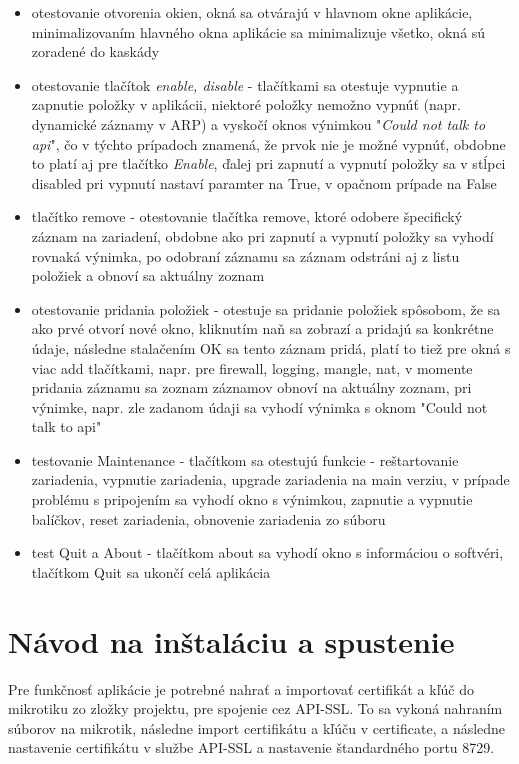 \begin{itemize}
\item otestovanie otvorenia okien, okná sa otvárajú v hlavnom okne aplikácie, minimalizovaním hlavného okna aplikácie sa minimalizuje všetko, okná sú zoradené do kaskády
\item otestovanie tlačítok \textit{enable, disable} - tlačítkami sa otestuje vypnutie a zapnutie položky v aplikácii, niektoré položky nemožno vypnúť (napr. dynamické záznamy v ARP) a vyskočí oknos výnimkou "\textit{Could not talk to api}", čo v týchto prípadoch znamená, že prvok nie je možné vypnúť, obdobne to platí aj pre tlačítko \textit{Enable}, ďalej pri zapnutí a vypnutí položky sa v stĺpci disabled pri vypnutí nastaví paramter na True, v opačnom prípade na False
\item tlačítko remove - otestovanie tlačítka remove, ktoré odobere špecifický záznam na zariadení, obdobne ako pri zapnutí a vypnutí položky sa vyhodí rovnaká výnimka, po odobraní záznamu sa záznam odstráni aj z listu položiek a obnoví sa aktuálny zoznam 
\item otestovanie pridania položiek - otestuje sa pridanie položiek spôsobom, že sa ako prvé otvorí nové okno, kliknutím naň sa zobrazí  a pridajú sa konkrétne údaje, následne stalačením OK sa tento záznam pridá, platí to tiež pre okná s viac add tlačítkami, napr. pre firewall, logging, mangle, nat, v momente pridania záznamu  sa zoznam záznamov obnoví na aktuálny zoznam, pri výnimke, napr. zle zadanom údaji sa vyhodí výnimka s oknom "Could not talk to api"
\item testovanie Maintenance - tlačítkom sa otestujú funkcie - reštartovanie zariadenia, vypnutie zariadenia, upgrade zariadenia na main verziu, v prípade problému s pripojením sa vyhodí okno s výnimkou, zapnutie a vypnutie balíčkov, reset zariadenia, obnovenie zariadenia zo súboru
\item test Quit a About - tlačítkom about sa vyhodí okno s informáciou o softvéri, tlačítkom Quit sa ukončí celá aplikácia 
\end{itemize}
\chapter{Návod na inštaláciu a spustenie}
Pre funkčnosť aplikácie je potrebné nahrať a importovať certifikát a kľúč do mikrotiku zo zložky projektu, pre spojenie cez API-SSL. To sa vykoná nahraním súborov na mikrotik, následne import certifikátu a kľúču v certificate, a následne nastavenie certifikátu v službe API-SSL a nastavenie štandardného portu 8729.
